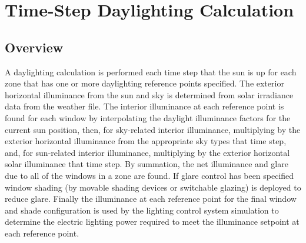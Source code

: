 \section{Time-Step Daylighting Calculation}\label{time-step-daylighting-calculation}

\subsection{Overview}\label{overview-027}

A daylighting calculation is performed each time step that the sun is up for each zone that has one or more daylighting reference points specified.
The exterior horizontal illuminance from the sun and sky is determined from solar irradiance data from the weather file.
The interior illuminance at each reference point is found for each window by interpolating the daylight illuminance factors for the current sun position, then,
for sky-related interior illuminance, multiplying by the exterior horizontal illuminance from the appropriate sky types that time step, and,
for sun-related interior illuminance, multiplying by the exterior horizontal solar illuminance that time step.
By summation, the net illuminance and glare due to all of the windows in a zone are found. 
If glare control has been specified window shading (by movable shading devices or switchable glazing) is deployed to reduce glare.
Finally the illuminance at each reference point for the final window and shade configuration is used by the lighting control system simulation
to determine the electric lighting power required to meet the illuminance setpoint at each reference point.

